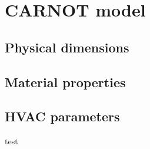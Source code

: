 \section{CARNOT model}

\subsection{Physical dimensions}

\subsection{Material properties}

\subsection{HVAC parameters}

{\color{red}test}


\clearpage
